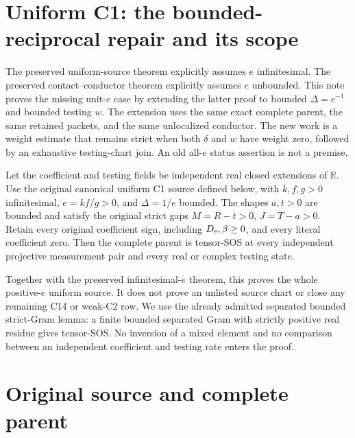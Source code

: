 

\section{Uniform C1: the bounded-reciprocal repair and its scope}

The preserved uniform-source theorem explicitly assumes $e$ infinitesimal.
The preserved contact--conductor theorem explicitly assumes $e$ unbounded.
This note proves the missing unit-$e$ case by extending the latter proof
to bounded $\Delta=e^{-1}$ and bounded testing $w$. The extension uses
the same exact complete parent, the same retained packets, and the same
unlocalized conductor. The new work is a weight estimate that remains
strict when both $\delta$ and $w$ have weight zero, followed by an
exhaustive testing-chart join. An old all-$e$ status assertion is not a
premise.

\begin{theorem}
\label{thm:bounded-delta}
Let the coefficient and testing fields be independent real closed
extensions of $\mathbb R$. Use the original canonical uniform C1 source
defined below, with $k,f,g>0$ infinitesimal, $e=kf/g>0$, and
$\Delta=1/e$ bounded. The shapes $a,t>0$ are bounded and satisfy the
original strict gaps $M=R-t>0$, $J=T-a>0$. Retain every original
coefficient sign, including $D_{\rm e},\beta\geq0$, and every literal
coefficient zero. Then the complete parent is tensor-SOS at every
independent projective measurement pair and every real or complex
testing state.
\end{theorem}

Together with the preserved infinitesimal-$e$ theorem, this proves the
whole positive-$e$ uniform source. It does not prove an unlisted source
chart or close any remaining C14 or weak-C2 row. We use the already
admitted separated bounded strict-Gram lemma: a finite bounded separated
Gram with strictly positive real residue gives tensor-SOS. No inversion
of a mixed element and no comparison between an independent coefficient
and testing rate enters the proof.

\section{Original source and complete parent}

